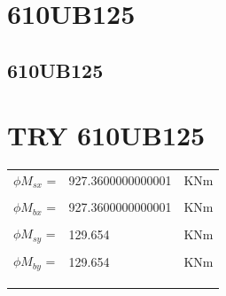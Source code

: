 \documentclass{article}%
\begin{document}
%
\normalsize%
\pagestyle{firstpage}%
\section{610UB125}%
\label{sec:610UB125}%

%
\subsection{610UB125}%
\label{subsec:610UB125}%

%
\section*{TRY 610UB125}%
\label{sec:TRY610UB125}%
\begin{tabular}{lll}%
$\phi M_{sx}$ =  &927.3600000000001& KNm\\%
&&\\%
$\phi M_{bx}$ =  &927.3600000000001& KNm\\%
&&\\%
$\phi M_{sy}$ =  &129.654& KNm\\%
&&\\%
$\phi M_{by}$ =  &129.654& KNm\\%
&&\\%
&&\\%
&&\\%
\end{tabular}

%
\end{document}
